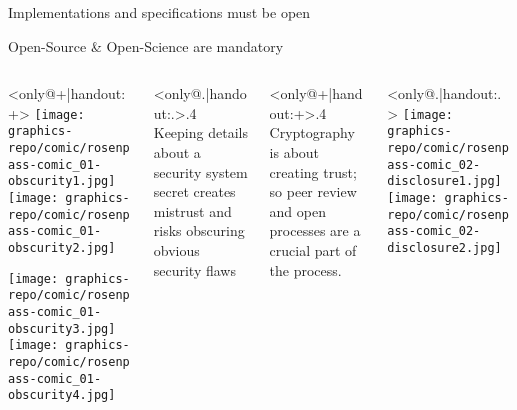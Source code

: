 \begin{frame}{Implementations and specifications must be open}
\end{frame}


\begin{frame}{Open-Source \& Open-Science are mandatory}
  \begin{columns}[onlytextwidth,c]
      \begin{column}<only@+|handout:+>{}
        \texttt{[image: graphics-repo/comic/rosenpass-comic\_01-obscurity1.jpg]}%
        \texttt{[image: graphics-repo/comic/rosenpass-comic\_01-obscurity2.jpg]}

        \texttt{[image: graphics-repo/comic/rosenpass-comic\_01-obscurity3.jpg]}%
        \texttt{[image: graphics-repo/comic/rosenpass-comic\_01-obscurity4.jpg]}
      \end{column}
		
      \begin{column}<only@.|handout:.>{.4\linewidth}
        Keeping details about a security system secret creates mistrust and risks obscuring obvious security flaws
      \end{column}

      \begin{column}<only@+|handout:+>{.4\linewidth}
        Cryptography is about creating trust; so peer review and open processes are a crucial part of the process.
      \end{column}
	\hfill
      \begin{column}<only@.|handout:.>{}
        \texttt{[image: graphics-repo/comic/rosenpass-comic\_02-disclosure1.jpg]}%
        \texttt{[image: graphics-repo/comic/rosenpass-comic\_02-disclosure2.jpg]}
      \end{column}
  \end{columns}
\end{frame}

